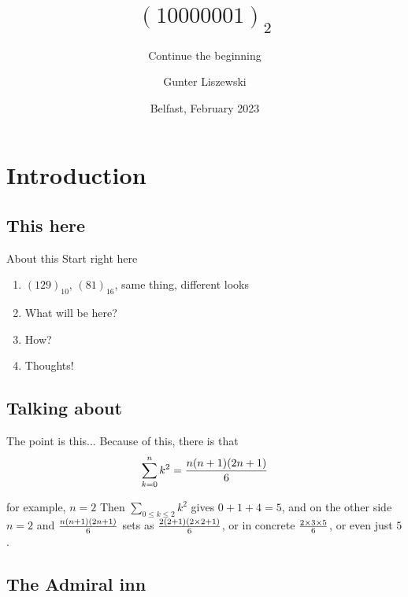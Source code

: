 \documentclass[pdf]{beamer}
\title{$(10000001)_2$}
\subtitle{Continue the beginning}
\author[Gunter Liszewski\\ \copyright 2018]{Gunter Liszewski}
\date{Belfast, February 2023}
\begin{document}
\begin{frame}
  \titlepage
\end{frame}


\section{Introduction}
\subsection{This here}

\begin{frame}{About this}
  Start right here
  \begin{enumerate}[A]
    \pause
    \item{} $(129)_{10}$, $(81)_{16}$, same thing, different looks
    \pause
    \item{} What will be here?
    \pause
    \item{} How?
    \pause
    \item{} Thoughts!
  \end{enumerate}
\end{frame}
\subsection{Talking about}

\begin{frame}{The point is this...}
  Because of this, there is that
$$\sum_{k=0}^{n}{k^2}={n(n+1)(2n+1)\over 6}$$
\end{frame}


\begin{frame}{for example, $n=2$}
  Then $\sum_{0\le k\le2}k^2$ gives $0+1+4=5$, and on the other side $n=2$ and ${n(n+1)(2n+1)\over 6}$
sets as ${2(2+1)(2\times2+1)\over 6}$, or in concrete $2\times3\times5\over6$, or even just $5$.
\end{frame}

\subsection{The Admiral inn}
\end{document}
